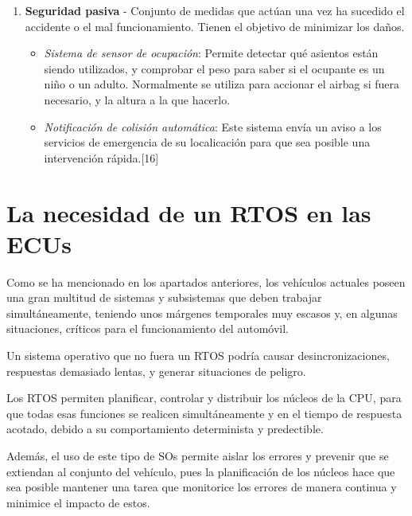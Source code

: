\begin{enumerate}
    \item \textbf{Seguridad pasiva} - Conjunto de medidas que actúan una vez ha sucedido el accidente o el mal funcionamiento. Tienen el objetivo de minimizar los daños.

    \begin{itemize}
        \item \textit{Sistema de sensor de ocupación}: Permite detectar qué asientos están siendo utilizados, y comprobar el peso para saber si el ocupante es un niño o un adulto. Normalmente se utiliza para accionar el airbag si fuera necesario, y la altura a la que hacerlo.

        \item \textit{Notificación de colisión automática}: Este sistema envía un aviso a los servicios de emergencia de su localicación para que sea posible una intervención rápida.[16]
    \end{itemize}
\end{enumerate}




\section{La necesidad de un RTOS en las ECUs}

Como se ha mencionado en los apartados anteriores, los vehículos actuales poseen una gran multitud de sistemas y subsistemas que deben trabajar simultáneamente, teniendo unos márgenes temporales muy escasos y, en algunas situaciones, críticos para el funcionamiento del automóvil. 

Un sistema operativo que no fuera un RTOS podría causar desincronizaciones, respuestas demasiado lentas, y generar situaciones de peligro. 

Los RTOS permiten planificar, controlar y distribuir los núcleos de la CPU, para que todas esas funciones se realicen simultáneamente y en el tiempo de respuesta acotado, debido a su comportamiento determinista y predectible. 

Además, el uso de este tipo de SOs permite aislar los errores y prevenir que se extiendan al conjunto del vehículo, pues la planificación de los núcleos hace que sea posible mantener una tarea que monitorice los errores de manera continua y minimice el impacto de estos.